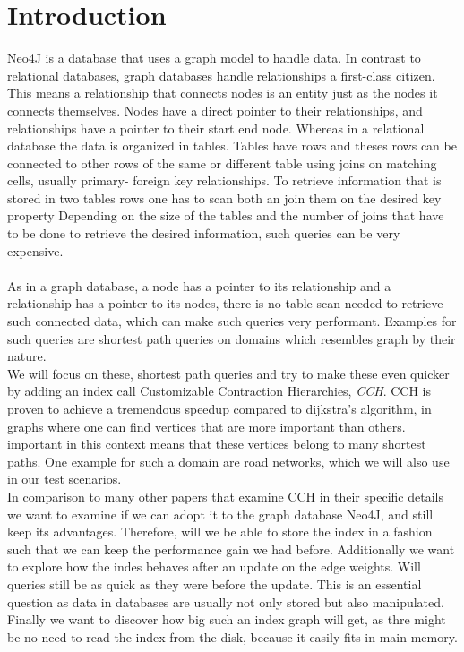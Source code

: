 \chapter{Introduction}

Neo4J is a database that uses a graph model to handle data. In contrast to relational databases, graph databases handle relationships a first-class citizen. 
This means a relationship that connects nodes is an entity just as the nodes it connects themselves. Nodes have a direct pointer to their relationships, and relationships
have a pointer to their start end node. Whereas in a relational database the data is organized in tables. Tables have rows and theses rows can be connected to other rows 
of the same or different table using joins on matching cells, usually primary- foreign key relationships. To retrieve information that is stored in two tables rows one has to scan 
both an join them on the desired key property Depending on the size of the tables and the number of joins that have to be done to retrieve the desired information, such queries
can be very expensive. 
\\\\
As in a graph database, a node has a pointer to its relationship and a relationship has a pointer to its nodes, there is no table scan needed to retrieve such connected data, which can make such queries very 
performant. Examples for such queries are shortest path queries on domains which resembles graph by their nature. 
\\
We will focus on these, shortest path queries and try to make these even quicker by adding an index call Customizable Contraction Hierarchies, \textit{CCH}. CCH is proven to achieve a tremendous speedup
compared to dijkstra's algorithm, in graphs where one can find vertices that are more important than others. important in this context means that these vertices belong to many shortest paths. One example for
such a domain are road networks, which we will also use in our test scenarios.  
\\
In comparison to many other papers that examine CCH in their specific details we want to examine if we can adopt it to the graph database Neo4J, and still keep its advantages. Therefore, will we be able to store the 
index in a fashion such that we can keep the performance gain we had before. Additionally we want to explore how the indes behaves after an update on the edge weights. Will queries still be as quick as they were before the update.
This is an essential question as data in databases are usually not only stored but also manipulated. Finally we want to discover how big such an index graph will get, as thre might be no need to read the index from the disk,
because it easily fits in main memory.